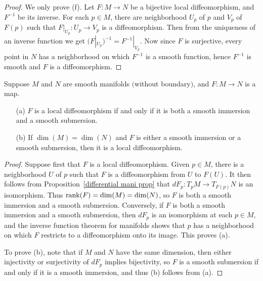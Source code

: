 \begin{proof}
We only prove (f). Let $F:M\to N$ be a bijective local diffeomorphism, and $F^{-1}$ be its inverse. For each $p\in M$, there are neighborhood $U_p$ of $p$ and $V_p$ of $F(p)$ such that $F|_{U_p}:U_p\to V_p$ is a diffeomorphism. Then from the uniqueness of an inverse function we get $(F|_{U_p})^{-1}=F^{-1}|_{V_p}$. Now since $F$ is surjective, every point in $N$ has a neighborhood on which $F^{-1}$ is a smooth function, hence $F^{-1}$ is smooth and $F$ is a diffeomorphism.
\end{proof}
\begin{proposition}\label{local diff iff}
Suppose $M$ and $N$ are smooth manifolds $($without boundary$)$, and $F:M\to N$ is a map.
\begin{itemize}
\item[(a)] $F$ is a local diffeomorphism if and only if it is both a smooth immersion and a smooth submersion.
\item[(b)] If $\dim(M)=\dim(N)$ and $F$ is either a smooth immersion or a smooth submersion, then it is a local diffeomorphism.
\end{itemize}
\end{proposition}
\begin{proof}
Suppose first that $F$ is a local diffeomorphism. Given $p\in M$, there is a neighborhood $U$ of $p$ such that $F$ is a diffeomorphism from $U$ to $F(U)$. It then follows from Proposition~\ref{differential mani prop} that $dF_p:T_pM\to T_{F(p)}N$ is an isomorphism. Thus $\mathrm{rank}(F)=\dim(M)=\dim(N)$, so $F$ is both a smooth immersion and a smooth submersion. Conversely, if $F$ is both a smooth immersion and a smooth submersion, then $dF_p$ is an isomorphism at each $p\in M$, and the inverse function theorem for manifolds shows that $p$ has a neighborhood on which $F$ restricts to a diffeomorphism onto its image. This proves (a).\par
To prove (b), note that if $M$ and $N$ have the same dimension, then either injectivity or surjectivity of $dF_p$ implies bijectivity, so $F$ is a smooth submersion if and only if it is a smooth immersion, and thus (b) follows from (a).
\end{proof}
